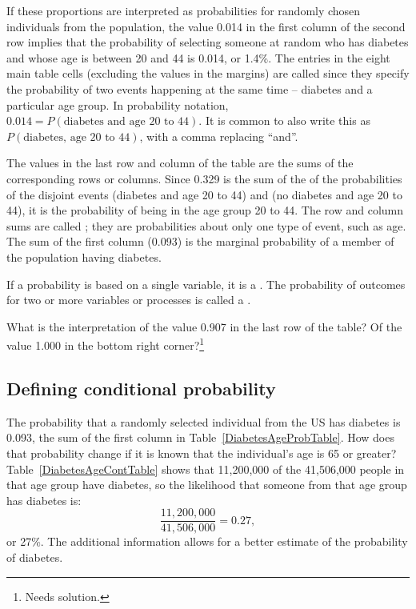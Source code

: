 If these proportions are interpreted as probabilities for randomly chosen individuals from the population, the value 0.014 in the first column of the second row implies that the probability of selecting someone at random who has diabetes and whose age is between 20 and 44 is 0.014, or 1.4\%. The entries in the eight main table cells (excluding the values in the margins) are called  since they specify the probability of two events happening at the same time -- diabetes and a particular age group. In probability notation, $0.014 = P(\text{diabetes and age 20 to 44})$. It is common to also write this as $P(\text{diabetes, age 20 to 44})$, with a comma replacing ``and''.

The values in the last row and column of the table are the sums of the corresponding rows or columns. Since 0.329 is the sum of the of the probabilities of the disjoint events (diabetes and age 20 to 44) and (no diabetes and age 20 to 44), it is the probability of being in the age group 20 to 44. The row and column sums are called ; they are probabilities about only one type of event, such as age. The sum of the first column (0.093) is the marginal probability of a member of the population having diabetes.

\begin{termBox}{
If a probability is based on a single variable, it is a \emph{}. The probability of outcomes for two or more variables or processes is called a \emph{}.}
\end{termBox}

\begin{exercise} 
  {What is the interpretation of the value 0.907 in the last row of the table?  Of the value 1.000 in the bottom right corner?\footnote{Needs solution.}}
\label{MarginalJointProbDiabetes}
\end{exercise}


\subsection{Defining conditional probability}


The probability that a randomly selected individual from the US has diabetes is 0.093, the sum of the first column in Table~\ref{DiabetesAgeProbTable}.  How does that probability change if it is known that the individual's age is 65 or greater?  Table~\ref{DiabetesAgeContTable} shows that 11,200,000 of the 41,506,000 people in that age group have diabetes, so the likelihood that someone from that age group has diabetes is:
\[  
     \frac{11,200,000}{41,506,000} = 0.27,
\]
or 27\%.  The additional information allows for a better estimate of the probability of diabetes.

